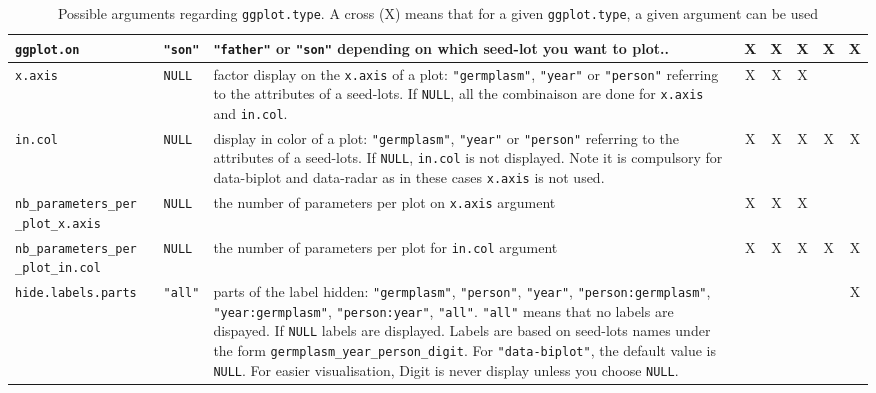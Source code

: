 \documentclass{article}\usepackage[]{graphicx}\usepackage[]{color}
\begin{document}
\begin{itemize}
\begin{itemize}
\begin{center}
\begin{table}[H]
\begin{tabular}{ 
p{} 
p{} 
p{}
ccccc 
}
\texttt{ggplot.on} & 
\texttt{"son"} & 
\texttt{"father"} or \texttt{"son"} depending on which seed-lot you want to plot.. &
X &
X &
X &
X &
X \\
\hline

\texttt{x.axis} & 
\texttt{NULL} & 
factor display on the \texttt{x.axis}	 of a plot: \texttt{"germplasm"}, \texttt{"year"} or \texttt{"person"} referring to the attributes of a seed-lots. If \texttt{NULL}, all the combinaison are done for \texttt{x.axis} and \texttt{in.col}. &
X &
X &
X &
  &
\\
\hline

\texttt{in.col} & 
\texttt{NULL} & 
display in color of a plot: \texttt{"germplasm"}, \texttt{"year"} or \texttt{"person"} referring to the attributes of a seed-lots. If \texttt{NULL}, \texttt{in.col} is not displayed. Note it is compulsory for data-biplot and data-radar as in these cases \texttt{x.axis} is not used. &
X &
X &
X &
X &
X \\
\hline

\texttt{nb\_parameters\_per} \texttt{\_plot\_x.axis} & 
\texttt{NULL} & 
the number of parameters per plot on \texttt{x.axis} argument &
X &
X &
X &
  &
\\
\hline

\texttt{nb\_parameters\_per} \texttt{\_plot\_in.col} & 
\texttt{NULL} & 
the number of parameters per plot for \texttt{in.col} argument &
X &
X &
X &
X &
X \\
\hline

\texttt{hide.labels.parts} & 
\texttt{"all"} & 
parts of the label hidden: \texttt{"germplasm"}, \texttt{"person"}, \texttt{"year"}, \texttt{"person:germplasm"}, \texttt{"year:germplasm"}, \texttt{"person:year"}, \texttt{"all"}. 
\texttt{"all"} means that no labels are dispayed. 
If \texttt{NULL} labels are displayed. Labels are based on seed-lots names under the form \texttt{germplasm\_year\_person\_digit}.
For \texttt{"data-biplot"}, the default value is \texttt{NULL}.
For easier visualisation, Digit is never display unless you choose \texttt{NULL}. &
  &
  &
  &
  &
X \\

\hline
\end{tabular}
\caption{Possible arguments regarding \texttt{ggplot.type}.
A cross (X) means that for a given \texttt{ggplot.type}, a given argument can be used}
\label{custom.plot}
\end{table}
\end{center}

\end{itemize}



\end{itemize}
\end{document}
